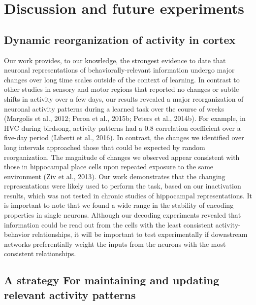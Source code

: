 \chapter{Discussion and future experiments} \label{chapter_5}

\section{Dynamic reorganization of activity in cortex} \label{discussion:general}

Our work provides, to our knowledge, the strongest evidence to date that neuronal representations of behaviorally-relevant information undergo major changes over long time scales outside of the context of learning. In contrast to other studies in sensory and motor regions that reported no changes or subtle shifts in activity over a few days, our results revealed a major reorganization of neuronal activity patterns during a learned task over the course of weeks (Margolis et al., 2012; Peron et al., 2015b; Peters et al., 2014b). For example, in HVC during birdsong, activity patterns had a 0.8 correlation coefficient over a five-day period (Liberti et al., 2016). In contrast, the changes we identified over long intervals approached those that could be expected by random reorganization. The magnitude of changes we observed appear consistent with those in hippocampal place cells upon repeated exposure to the same environment (Ziv et al., 2013). Our work demonstrates that the changing representations were likely used to perform the task, based on our inactivation results, which was not tested in chronic studies of hippocampal representations. It is important to note that we found a wide range in the stability of encoding properties in single neurons. Although our decoding experiments revealed that information could be read out from the cells with the least consistent activity-behavior relationships, it will be important to test experimentally if downstream networks preferentially weight the inputs from the neurons with the most consistent relationships.

\section{A strategy For maintaining and updating relevant activity patterns} \label{discussion:utility_argument}

